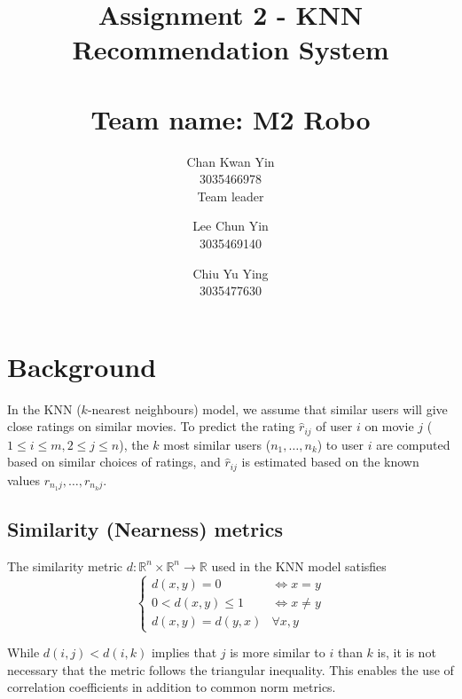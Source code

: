 \documentclass[final]{cvpr}
\begin{document}
\title{
	Assignment 2 - KNN Recommendation System \\~\\
	\large{Team name: M2 Robo}
}

\author{
	Chan Kwan Yin\\
	3035466978 \\
	Team leader

	\and

	Lee Chun Yin\\
	3035469140\\

	\and

	Chiu Yu Ying\\
	3035477630
}

\maketitle

\clearpage

\section{Background}

In the KNN ($k$-nearest neighbours) model, we assume that similar users will give close ratings on similar movies.
To predict the rating $\hat r_{ij}$ of user $i$ on movie $j$ ($1 \le i \le m, 2 \le j \le n$),
the $k$ most similar users ($n_1, \ldots, n_k$) to user $i$ are computed based on similar choices of ratings,
and $\hat r_{ij}$ is estimated based on the known values $r_{n_1j}, \ldots, r_{n_kj}$.

\subsection{Similarity (Nearness) metrics}
The similarity metric $d : \mathbb R^n \times \mathbb R^n \to \mathbb R$ used in the KNN model satisfies
\begin{equation} \label{eq:metric} \begin{cases}
	d(x, y) = 0 &\iff x = y \\
	0 < d(x, y) \leq 1 &\iff x \ne y \\
	d(x, y) = d(y, x) &\forall x, y
\end{cases} \end{equation}

While $d(i, j) < d(i, k)$ implies that $j$ is more similar to $i$ than $k$ is,
it is not necessary that the metric follows the triangular inequality.
This enables the use of correlation coefficients in addition to common norm metrics.
\end{document}
